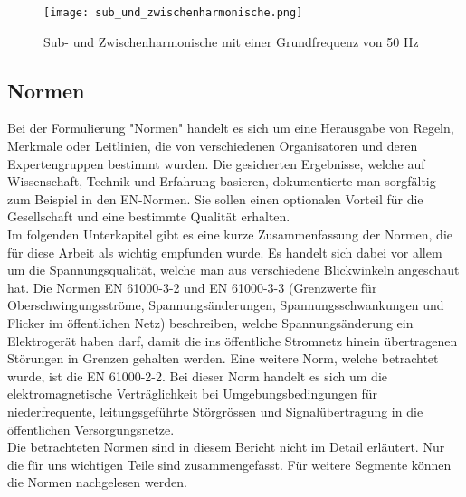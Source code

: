 \begin{figure}[ht!]
	\centering
	\texttt{[image: sub\_und\_zwischenharmonische.png]}	
	\caption{Sub- und Zwischenharmonische mit einer Grundfrequenz von 50 Hz}
	\label{fig:Sub und Zwischenharmonische}
\end{figure}



\subsection{Normen}
Bei der Formulierung "Normen" handelt es sich um eine Herausgabe von Regeln, Merkmale oder Leitlinien, die von verschiedenen Organisatoren und deren Expertengruppen bestimmt wurden. Die gesicherten Ergebnisse, welche auf Wissenschaft, Technik und Erfahrung basieren, dokumentierte man sorgfältig zum Beispiel in den EN-Normen. Sie sollen einen optionalen Vorteil für die Gesellschaft und eine bestimmte Qualität erhalten.\\
Im folgenden Unterkapitel gibt es eine kurze Zusammenfassung der Normen, die für diese Arbeit als wichtig empfunden wurde. Es handelt sich dabei vor allem um die Spannungsqualität, welche man aus verschiedene Blickwinkeln angeschaut hat. Die Normen EN 61000-3-2 und EN 61000-3-3 (Grenzwerte für Oberschwingungsströme, Spannungsänderungen, Spannungsschwankungen und Flicker im öffentlichen Netz) beschreiben, welche Spannungsänderung ein Elektrogerät haben darf, damit die ins öffentliche Stromnetz hinein übertragenen Störungen in Grenzen gehalten werden. Eine weitere Norm, welche betrachtet wurde, ist die EN 61000-2-2. Bei dieser Norm handelt es sich um die elektromagnetische Verträglichkeit bei Umgebungsbedingungen für niederfrequente, leitungsgeführte Störgrössen und Signalübertragung in die öffentlichen Versorgungsnetze.\\
Die betrachteten Normen sind in diesem Bericht nicht im Detail erläutert. Nur die für uns wichtigen Teile sind zusammengefasst. Für weitere Segmente können die Normen nachgelesen werden. 


